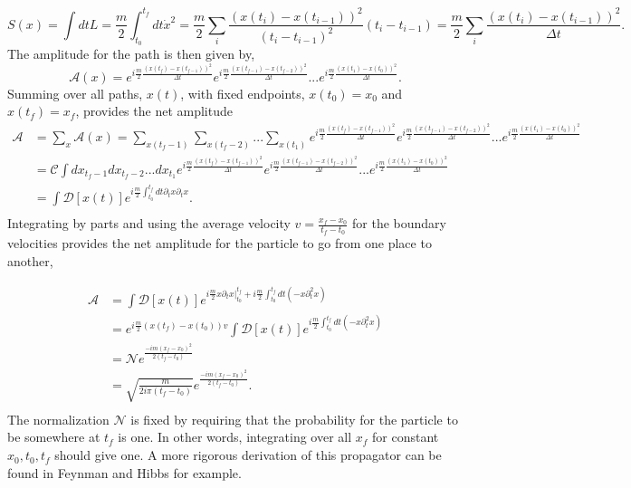 \begin{equation}
S(x) = \int dt L = \frac{m}{2} \int_{t_0}^{t_f} dt \dot{x}^2 = \frac{m}{2} \sum_i \frac{(x(t_i) - x(t_{i-1}))^2}{(t_i - t_{i-1})^2} (t_i - t_{i-1})  
= \frac{m}{2} \sum_i \frac{(x(t_i) - x(t_{i-1}))^2}{\Delta t}.
\end{equation}
The amplitude for the path is then given by, 
%
\begin{equation}
\mathcal{A}(x) = e^{i\frac{m}{2}\frac{(x(t_f) - x(t_{f-1}))^2}{\Delta t}}e^{i\frac{m}{2}\frac{(x(t_{f-1}) - x(t_{f-2}))^2}{\Delta t}}...e^{i\frac{m}{2}\frac{(x(t_1) - x(t_{0}))^2}{\Delta t}}.
\end{equation}
Summing over all paths, $x(t)$, with fixed endpoints, $x(t_0) = x_0$ and $x(t_f) = x_f$, provides the net amplitude 
%
\begin{equation}
\begin{split}
\mathcal{A} &= \sum_{x} \mathcal{A}(x) = \sum_{x(t_f-1)} \sum_{x(t_f-2)} ... \sum_{x(t_1)} 
e^{i\frac{m}{2}\frac{(x(t_f) - x(t_{f-1}))^2}{\Delta t}}e^{i\frac{m}{2}\frac{(x(t_{f-1}) - x(t_{f-2}))^2}{\Delta t}}...
e^{i\frac{m}{2}\frac{(x(t_1) - x(t_{0}))^2}{\Delta t}} \\
&= \mathcal{C} \int dx_{t_f-1}dx_{t_f-2}...dx_{t_1} 
e^{i\frac{m}{2}\frac{(x(t_f) - x(t_{f-1}))^2}{\Delta t}}e^{i\frac{m}{2}\frac{(x(t_{f-1}) - x(t_{f-2}))^2}{\Delta t}}...
e^{i\frac{m}{2}\frac{(x(t_1) - x(t_{0}))^2}{\Delta t}}\\
& = \int \mathcal{D}[x(t)] e^{i\frac{m}{2}\int_{t_0}^{t_f} dt \partial_t x \partial_t x}.\\
\end{split}
\end{equation} 
Integrating by parts and using the average velocity $v = \frac{x_f-x_0}{t_f - t_0}$ for the boundary velocities provides the net amplitude for the particle to go from one place to another,

\begin{equation}
\begin{split}
\mathcal{A} &= \int \mathcal{D}[x(t)] e^{i\frac{m}{2}x\partial_t x|^{t_f}_{t_0} + i\frac{m}{2}\int_{t_0}^{t_f} dt (-x \partial^2_t x)} \\ 
            &= e^{i\frac{m}{2}(x(t_f) - x(t_0))v}\int \mathcal{D}[x(t)] e^{i\frac{m}{2}\int_{t_0}^{t_f} dt (-x \partial^2_t x)} \\
            &= \mathcal{N}e^{\frac{-im(x_f - x_0)^2}{2(t_f - t_0)}} \\
            &= \sqrt{\frac{m}{2i\pi(t_f-t_0)}}e^{\frac{-im(x_f - x_0)^2}{2(t_f - t_0)}}. \\
\end{split}
\end{equation}
The normalization $\mathcal{N}$ is fixed by requiring that the probability for the particle to be somewhere at $t_f$ is one. In other words, integrating over all $x_f$ for constant $x_0, t_0, t_f$ should give one. A more rigorous derivation of this propagator can be found in {\color{red} Feynman and Hibbs} for example.

